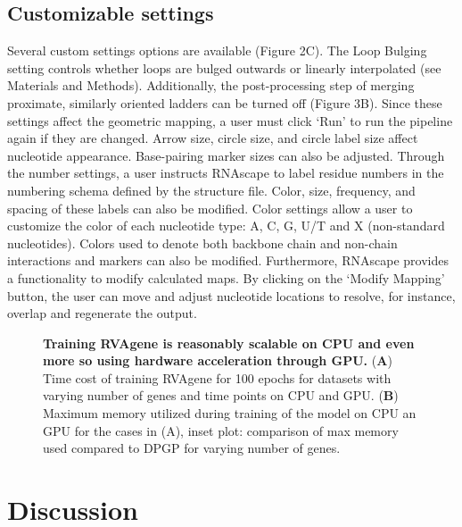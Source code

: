 \subsection{Customizable settings}

Several custom settings options are available (Figure 2C). The Loop Bulging setting controls whether loops are bulged outwards or linearly interpolated (see Materials and Methods). Additionally, the post-processing step of merging proximate, similarly oriented ladders can be turned off (Figure 3B). Since these settings affect the geometric mapping, a user must click ‘Run’ to run the pipeline again if they are changed. Arrow size, circle size, and circle label size affect nucleotide appearance. Base-pairing marker sizes can also be adjusted. Through the number settings, a user instructs RNAscape to label residue numbers in the numbering schema defined by the structure file. Color, size, frequency, and spacing of these labels can also be modified. Color settings allow a user to customize the color of each nucleotide type: A, C, G, U/T and X (non-standard nucleotides). Colors used to denote both backbone chain and non-chain interactions and markers can also be modified. Furthermore, RNAscape provides a functionality to modify calculated maps. By clicking on the ‘Modify Mapping’ button, the user can move and adjust nucleotide locations to resolve, for instance, overlap and regenerate the output.
\begin{center}
    \begin{figure}
        \caption[Computational cost of training RVAgene]{\textbf{Training RVAgene is reasonably scalable on CPU and even more so using hardware acceleration through GPU.} ({\bf A}) Time cost of training RVAgene for 100 epochs for datasets with varying number of genes and time points on CPU and GPU. ({\bf B}) Maximum memory utilized during training of the model on CPU an GPU for the cases in (A), inset plot: comparison of max memory used compared to DPGP for varying number of genes.}
  \label{fig:rnascape4}
\end{figure}
\end{center}

\section{Discussion}


